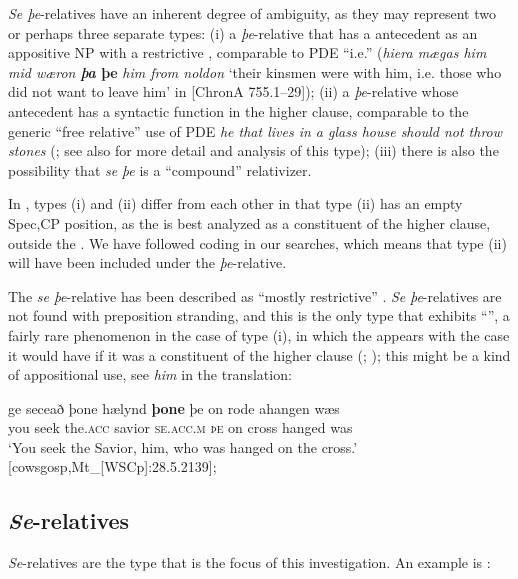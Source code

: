 \documentclass[output=paper,colorlinks,citecolor=brown]{langscibook}
\begin{document}
\textit{Se þe}-relatives have an inherent degree of ambiguity, as they may represent two or perhaps three separate types: (i) a \textit{þe}{}-relative that has a  antecedent as an appositive NP with a restrictive , comparable to PDE “i.e.” (\textit{hiera mægas him mid wæron} \textbf{\textit{þa} \textbf{þe}} \textit{him from noldon} ‘their kinsmen were with him, i.e. those who did not want to leave him' in [ChronA 755.1–29]); (ii) a \textit{þe}{}-relative whose  antecedent has a syntactic function in the higher clause, comparable to the generic “free relative” use of PDE \textit{he that lives in a glass house should not throw stones} (\citealt{Allen1977}; see also \citealt{Allen2020} for more detail and analysis of this type); (iii) there is also the possibility that \textit{se} \textit{þe} is a “compound” relativizer. 

In , types (i) and (ii) differ from each other in that type (ii) has an empty Spec,CP position, as the  is best analyzed as a constituent of the higher clause, outside the . We have followed  coding in our searches, which means that type (ii) will have been included under the \textit{þe}{}-relative. 

The \textit{se} \textit{þe}-relative has been described as “mostly restrictive” \citep{Mitchell1959}. \textit{Se} \textit{þe}-relatives are not found with preposition stranding, and this is the only type that exhibits “”, a fairly rare phenomenon in the case of type (i), in which the  appears with the case it would have if it was a constituent of the higher clause (\citealt[150]{vanKemenade1987}; \citealt{Allen2020}); this might be a kind of appositional use, see \textit{him} in the translation:

\ea\label{ex:los:4}
\gll ge seceað þone hælynd \textbf{þone} þe on rode ahangen wæs\\
you seek the.\textsc{acc} savior \textsc{se}.\textsc{acc.m} \textsc{þe} on cross hanged was\\
\glt ‘You seek the Savior, him, who was hanged on the cross.'\\ \hfill [cowsgosp,Mt\_[WSCp]:28.5.2139]; \citep[87]{Allen1977}
\z

\subsection{\textit{Se}-relatives} \label{sec:los:2.4}
\textit{Se}-relatives are the type that is the focus of this investigation. An example is :
\end{document}
